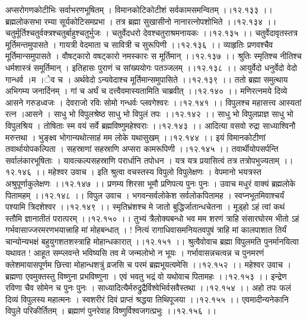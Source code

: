 \documentclass[11pt]{book}
\begin{document}
\begin{landscape}
अप्सरोगणकोटीभिः सर्वाभरणभूषितम् ।
विमानकोटिकोटीशं सर्वकामसमन्वितम् ।।१२.१३३ ।।
ब्रह्मलोकसभा रम्या सूर्यकोटिसमप्रभा ।
तत्र ब्रह्मा सुखासीनो नानारत्नोपशोभिते ।।१२.१३४ ।।
चतुर्मूर्तिश्चतुर्वक्त्रश्चतुर्बाहुश{}्चतुर्भुजः ।
चतुर्वेदधरो देवश्चतुराश्रमनायकः ।।१२.१३५ ।।
चतुर्वेदावृतस्तत्र मूर्तिमन्तमुपासते ।
गायत्री वेदमाता च सावित्री च सुरूपिणी ।।१२.१३६ ।।
व्याहृतिः प्रणवश्चैव मूर्तिमान्समुपासते ।
वौषट्कारो वषट्कारो नमस्कारः स मूर्तिमान् ।।१२.१३७ ।।
श्रुतिः स्मृतिश्च नीतिश्च धर्मशास्त्रं समूर्तिमान् ।
इतिहासः पुराणं च सांख्ययोगः पतञ्जलम् ।।१२.१३८ ।।
आयुर्वेदो धनुर्वेदो वेदो गान्धर्व{ ।}म{ ।}ेव च ।
अर्थवेदो ऽन्यवेदाश्च मूर्तिमान्समुपासिते ।।१२.१३९ ।।
ततो ब्रह्मा समुत्थाय अभिगम्य जनार्दिनम् ।
गां च अर्घं च दत्त्वैवमास्यतामिति चाब्रवीत् ।।१२.१४० ।।
मणिरत्नमये दिव्ये आसने गरुडध्वजः ।
देवराजो रविः सोमो गन्धर्वः प्लवगेश्वरः ।।१२.१४१ ।।
विपुलश्च महासत्त्व आस्यतां रत्न ।आसने ।
साधु भो विपुलश्रेष्ठ साधु भो विपुलं तपः ।।१२.१४२ ।।
साधु भो विपुलप्राज्ञ साधु भो विपुलश्रिय ।
तोषिताः स्म वयं सर्वे ब्रह्मविष्णुमहेश्वराः ।।१२.१४३ ।।
आदित्या वसवो रुद्रा साध्याश्विनौ मरुत्तथा ।
भुङ्क्ष्व भोगान्यथोत्साहं मम लोके यथासुखम् ।।१२.१४४ ।।
इयं विमानकोटीणां तवार्थायोपकल्पिता ।
सहस्राणां सहस्राणि अप्सरा कामरूपिणी ।।१२.१४५ ।।
तवार्थीयोपसर्पन्ति सर्वालंकारभूषिताः ।
यावत्कल्पसहस्राणि परार्धानि तपोधन ।
यत्र यत्र प्रयासित्वं तत्र तत्रोपभुज्यताम् ।।१२.१४६ ।।
महेश्वर उवाच ।
इति श्रुत्वा वचस्तस्य विपुलो विपुलेक्षणः ।
वेपमानो भयत्रस्त अश्रुपूर्णाकुलेक्षणः ।।१२.१४७ ।।
प्रणम्य शिरसा भूमौ प्रणिपत्य पुनः पुनः ।
उवाच मधुरं वाक्यं ब्रह्मलोके पितामहम् ।।१२.१४८ ।।
विपुल उवाच ।
भगवन्सर्वलोकेश सर्वलोकपितामह ।
स्वप्नभूतमिवाश्चर्यं पश्यामि त्रिदशेश्वर ।।१२.१४९ ।।
स्मृतिभ्रंशश्च मे जातो बुद्धिर्जातान्धचेतना ।
मूड्हो ऽहं त्वां कथं स्तौमि ज्ञानातीतं परात्परम् ।।१२.१५० ।।
तुभ्यं त्रैलोक्यबन्धो भव मम शरणं त्राहि संसारघोरम
भीतो ऽहं गर्भवासाज्जरमरणभयात्त्राहि मां मोहबन्धात् ।
! नित्यं रागाधिवासमनियतवपुषं त्राहि मां कालपाशात
तिर्यं चान्योन्यभक्षं बहुयुगशतशस्त्राहि मोहान्धकारात् ।।१२.१५१ ।।
श्रुत्वैवोवाच ब्रह्मा विपुलमति पुनर्मानयित्वा यथावत
! आहूत सम्प्लवन्ते भविष्यसि तव मे जन्मलोभो न भूयः ।
गर्भावासन्नचत्वन्न च पुनमरणं क्लेशमायासपूर्णम
छित्त्वा मोहान्धशत्रुं व्रजसि च परमं ब्रह्मभूयत्वमेसि ।।१२.१५२ ।।
महेश्वर उवाच ।
ब्रह्मणा एवमुक्तस्तु विष्णुना प्रभविष्णुना ।
एवं भवतु भद्रं वो यथोवाच पितामहः ।।१२.१५३ ।।
इन्द्रेण रविणा चैव सोमेन च पुनः पुनः ।
साध्यादित्यैर्मरुद्रुद्रैर्विश्वेभिर्वसवैस्तथा ।।१२.१५४ ।।
अहो तपः फलं दिव्यं विपुलस्य महात्मनः ।
स्वशरीरं दिवं प्राप्तं श्रद्धया तिथिपूजया ।।१२.१५५ ।।
एवमादीन्यनेकानि विपुले परिकीर्तितम् ।
ब्रह्माणं पुनरेवाह विष्णुर्विश्वजगत्प्रभुः ।।१२.१५६ ।।


\end{landscape}
\end{document}
